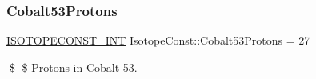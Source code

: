 \subsubsection{\texorpdfstring{Cobalt53\+Protons}{Cobalt53Protons}}
{\footnotesize\ttfamily \mbox{\hyperlink{group___isotope_const-_macros_ga5f18360b3e99483a35c32d789e62621c}{I\+S\+O\+T\+O\+P\+E\+C\+O\+N\+S\+T\+\_\+\+I\+NT}} Isotope\+Const\+::\+Cobalt53\+Protons = 27}

\$ \$ Protons in Cobalt-\/53. 